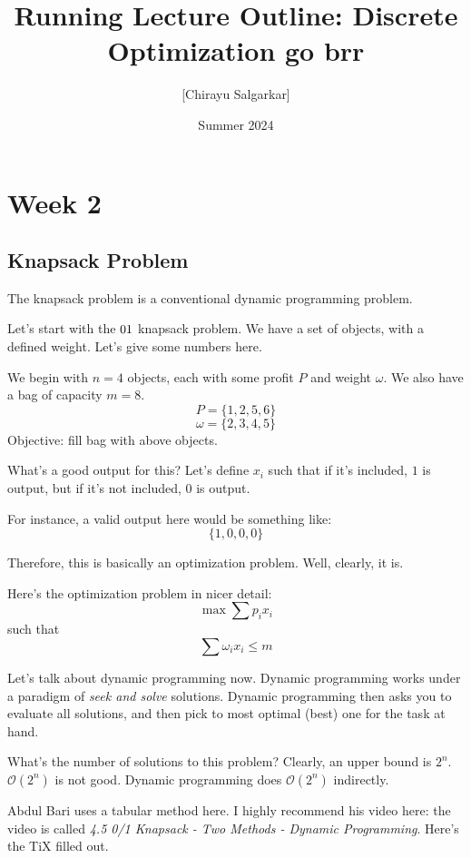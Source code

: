 \documentclass[10pt, oneside]{article}
\title{Running Lecture Outline: Discrete Optimization go brr}
\author{[Chirayu Salgarkar]}
\date{Summer 2024}
\begin{document}
\maketitle
\tableofcontents

\vspace{.25in}

\section{Week 2}

\subsection{Knapsack Problem}

The knapsack problem is a conventional dynamic programming problem. 

Let's start with the $0 \/ 1$ knapsack problem. We have a set of objects, with a defined weight. Let's give some numbers here.

We begin with $n = 4$ objects, each with some profit $P$ and weight $\omega$. We also have a bag of capacity $m = 8$.
\[ P = \{1, 2, 5, 6\}\]
\[ \omega = \{2, 3, 4, 5\} \]
Objective: fill bag with above objects. 

What's a good output for this? Let's define $x_i$ such that if it's included, $1$ is output, but if it's not included, $0$ is output. 

For instance, a valid output here would be something like:
\[ \{1, 0, 0, 0\} \]

Therefore, this is basically an optimization problem. Well, clearly, it is. 

Here's the optimization problem in nicer detail: 
\[ \max \sum p_ix_i\]
such that
\[ \sum \omega_ix_i \leq m \]

Let's talk about dynamic programming now. 
Dynamic programming works under a paradigm of \textit{seek and solve} solutions. Dynamic programming then asks you to evaluate all solutions, and then pick to most optimal (best) one for the task at hand.

What's the number of solutions to this problem? Clearly, an upper bound is $2^n$. 
$\mathcal{O}(2^n)$ is not good. Dynamic programming does $\mathcal{O}(2^n)$ indirectly. 

Abdul Bari uses a tabular method here. I highly recommend his video here: the video is called \textit{4.5 0/1 Knapsack - Two Methods - Dynamic Programming}. Here's the TiX filled out. 
\end{document}
